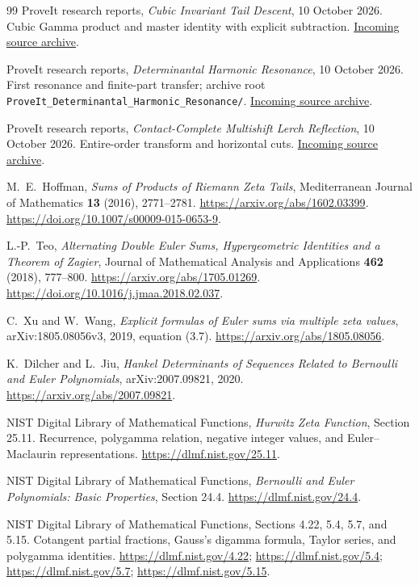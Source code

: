 \begin{thebibliography}{99}
ProveIt research reports,
\emph{Cubic Invariant Tail Descent}, 10 October 2026.
Cubic Gamma product and master identity with explicit subtraction.
\href{https://github.com/VladimirReshetnikov/ProveIt/blob/446dca9bd65c20e409d1d2561d4ffad408103e2a/docs/incoming/ProveIt_Cubic_Tail_Descent_2026-10-10.zip}{Incoming source archive}.

ProveIt research reports,
\emph{Determinantal Harmonic Resonance}, 10 October 2026.
First resonance and finite-part transfer; archive root
\texttt{ProveIt\_Determinantal\_Harmonic\_Resonance/}.
\href{https://github.com/VladimirReshetnikov/ProveIt/blob/446dca9bd65c20e409d1d2561d4ffad408103e2a/docs/incoming/ProveIt_Determinantal_Harmonic_Resonance_2026-10-10.zip}{Incoming source archive}.

ProveIt research reports,
\emph{Contact-Complete Multishift Lerch Reflection},
10 October 2026. Entire-order transform and horizontal cuts.
\href{https://github.com/VladimirReshetnikov/ProveIt/blob/446dca9bd65c20e409d1d2561d4ffad408103e2a/docs/incoming/ProveIt_Multishift_Reflection_2026-10-10.zip}{Incoming source archive}.

M.~E.~Hoffman,
\emph{Sums of Products of Riemann Zeta Tails},
Mediterranean Journal of Mathematics \textbf{13} (2016), 2771--2781.
\url{https://arxiv.org/abs/1602.03399}.
\url{https://doi.org/10.1007/s00009-015-0653-9}.

L.-P.~Teo,
\emph{Alternating Double Euler Sums, Hypergeometric Identities and a
Theorem of Zagier},
Journal of Mathematical Analysis and Applications \textbf{462}
(2018), 777--800.
\url{https://arxiv.org/abs/1705.01269}.
\url{https://doi.org/10.1016/j.jmaa.2018.02.037}.

C.~Xu and W.~Wang,
\emph{Explicit formulas of Euler sums via multiple zeta values},
arXiv:1805.08056v3, 2019, equation (3.7).
\url{https://arxiv.org/abs/1805.08056}.

K.~Dilcher and L.~Jiu,
\emph{Hankel Determinants of Sequences Related to Bernoulli and Euler
Polynomials}, arXiv:2007.09821, 2020.
\url{https://arxiv.org/abs/2007.09821}.

NIST Digital Library of Mathematical Functions,
\emph{Hurwitz Zeta Function}, Section 25.11.
Recurrence, polygamma relation, negative integer values,
and Euler--Maclaurin representations.
\url{https://dlmf.nist.gov/25.11}.

NIST Digital Library of Mathematical Functions,
\emph{Bernoulli and Euler Polynomials: Basic Properties}, Section 24.4.
\url{https://dlmf.nist.gov/24.4}.

NIST Digital Library of Mathematical Functions,
Sections 4.22, 5.4, 5.7, and 5.15.
Cotangent partial fractions, Gauss's digamma formula, Taylor series,
and polygamma identities.
\url{https://dlmf.nist.gov/4.22};
\url{https://dlmf.nist.gov/5.4};
\url{https://dlmf.nist.gov/5.7};
\url{https://dlmf.nist.gov/5.15}.

\end{thebibliography}
